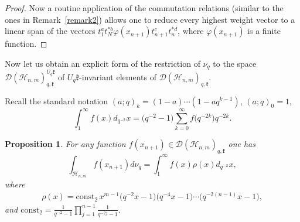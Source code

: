\documentclass[11pt]{article}
\newtheorem{proposition}{Proposition}
\begin{document}
\begin{proof}
Now a routine application of the commutation relations (similar to the ones in Remark~\ref{remark2}) allows one to reduce
every highest weight vector to a linear span of the vectors $t_1^at_N^{*b}\varphi(x_{n+1})t_{n+1}^ct_n^{*d}$,
where $\varphi(x_{n+1})$ is a f\/inite function.
\end{proof}



Now let us obtain an explicit form of the restriction of $\nu_q$ to the space
$\mathscr{D}(\mathscr{H}_{n,m})_{q,\mathfrak{k}}^{U_q \mathfrak{k}}$ of $U_q \mathfrak{k}$-invariant elements
of $\mathscr{D}(\mathscr{H}_{n,m})_{q,\mathfrak{k}}$.

Recall the standard notation $(a;q)_k=(1-a)\cdots (1-aq^{k-1})$, $(a;q)_0=1$,
\[
\int_{1}^\infty f(x) d_{q^{-2}}x=\big(q^{-2}-1\big)\sum_{k=0}^\infty f\big(q^{-2k}\big)q^{-2k}.
\]

\begin{proposition}\label{rad_int}
For any function $f(x_{n+1}) \in \mathscr{D}(\mathscr{H}_{n,m})_{q,\mathfrak{k}}$ one has
\[
\int_{\mathscr{H}_{n,m}} f(x_{n+1}) d\nu_q= \int_1^\infty f(x)\rho(x) d_{q^{-2}}x,
\]
where
\begin{gather}\label{rho_x}
\rho(x)=\mathrm{const_2}\,   x^{m-1}\big(q^{-2}x-1\big)\big(q^{-4}x-1\big)\cdots \big(q^{-2(n-1)}x-1\big),
\end{gather}
and $\mathrm{const_2}=\frac{1}{q^{-2}-1}\prod \limits_{j=1}^{n-1}\frac{1}{q^{-2j}-1}.$
\end{proposition}
\end{document}
